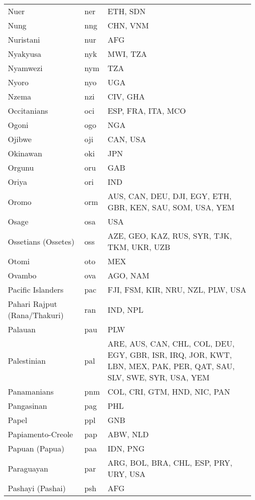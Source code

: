 \documentclass[12pt]{article}
\begin{document}
\begin{center}
\begin{longtable}{|p{7cm}|p{1cm}|p{7cm}|}
Nuer	&	ner	&	ETH, SDN	\\	\cline{1-3}
Nung	&	nng	&	CHN, VNM	\\	\cline{1-3}
Nuristani	&	nur	&	AFG	\\	\cline{1-3}
Nyakyusa	&	nyk	&	MWI, TZA	\\	\cline{1-3}
Nyamwezi	&	nym 	&	TZA	\\	\cline{1-3}
Nyoro	&	nyo 	&	UGA	\\	\cline{1-3}
Nzema	&	nzi 	&	CIV, GHA	\\	\cline{1-3}
Occitanians	&	oci 	&	ESP, FRA, ITA, MCO	\\	\cline{1-3}
Ogoni	&	ogo	&	NGA	\\	\cline{1-3}
Ojibwe	&	oji 	&	CAN, USA	\\	\cline{1-3}
Okinawan	&	oki	&	JPN	\\	\cline{1-3}
Orgunu	&	oru	&	GAB	\\	\cline{1-3}
Oriya	&	ori 	&	IND	\\	\cline{1-3}
Oromo	&	orm 	&	AUS, CAN, DEU, DJI, EGY, ETH, GBR, KEN, SAU, SOM, USA, YEM	\\	\cline{1-3}
Osage	&	osa 	&	USA	\\	\cline{1-3}
Ossetians (Ossetes)	&	oss 	&	AZE, GEO, KAZ, RUS, SYR, TJK, TKM, UKR, UZB	\\	\cline{1-3}
Otomi	&	oto 	&	MEX	\\	\cline{1-3}
Ovambo	&	ova	&	AGO, NAM	\\	\cline{1-3}
Pacific Islanders	&	pac	&	FJI, FSM, KIR, NRU, NZL, PLW, USA	\\	\cline{1-3}
Pahari Rajput (Rana/Thakuri)	&	ran	&	IND, NPL	\\	\cline{1-3}
Palauan	&	pau 	&	PLW	\\	\cline{1-3}
Palestinian	&	pal	&	ARE, AUS, CAN, CHL, COL, DEU, EGY, GBR, ISR, IRQ, JOR, KWT, LBN, MEX, PAK, PER, QAT, SAU, SLV, SWE, SYR, USA, YEM	\\	\cline{1-3}
Panamanians	&	pnm	&	COL, CRI, GTM, HND, NIC, PAN	\\	\cline{1-3}
Pangasinan	&	pag 	&	PHL	\\	\cline{1-3}
Papel	&	ppl	&	GNB	\\	\cline{1-3}
Papiamento-Creole	&	pap 	&	ABW, NLD	\\	\cline{1-3}
Papuan (Papua)	&	paa 	&	IDN, PNG	\\	\cline{1-3}
Paraguayan	&	par	&	ARG, BOL, BRA, CHL, ESP, PRY, URY, USA 	\\	\cline{1-3}
Pashayi (Pashai)	&	psh	&	AFG	\\	\cline{1-3}

\end{longtable}
\end{center}
\end{document}
